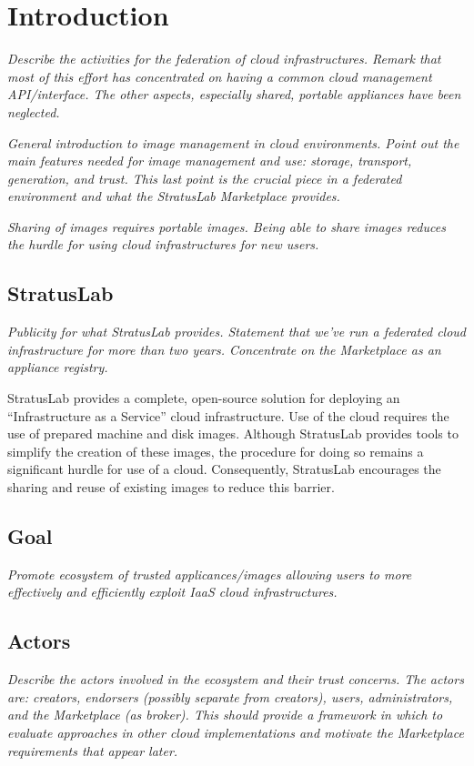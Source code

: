 \section{Introduction}
\label{sec:Introduction}

{\em Describe the activities for the federation of cloud
  infrastructures.  Remark that most of this effort has concentrated
  on having a common cloud management API/interface.  The other
  aspects, especially shared, portable appliances have been
  neglected.}

{\em General introduction to image management in cloud environments.
  Point out the main features needed for image management and use:
  storage, transport, generation, and trust.  This last point is
  the crucial piece in a federated environment and what the StratusLab
  Marketplace provides.}

{\em Sharing of images requires portable images.  Being able to share
  images reduces the hurdle for using cloud infrastructures for new
  users.}

\subsection{StratusLab}

{\em Publicity for what StratusLab provides.  Statement that we've run
  a federated cloud infrastructure for more than two years.
  Concentrate on the Marketplace as an appliance registry.}

StratusLab provides a complete, open-source solution for deploying an
``Infrastructure as a Service'' cloud infrastructure.  Use of the
cloud requires the use of prepared machine and disk images.  Although
StratusLab provides tools to simplify the creation of these images,
the procedure for doing so remains a significant hurdle for use of a
cloud.  Consequently, StratusLab encourages the sharing and reuse of
existing images to reduce this barrier.

\subsection{Goal}

{\em Promote ecosystem of trusted applicances/images allowing users to
  more effectively and efficiently exploit IaaS cloud
  infrastructures.}

\subsection{Actors}

{\em Describe the actors involved in the ecosystem and their trust
  concerns.  The actors are: creators, endorsers (possibly separate
  from creators), users, administrators, and the Marketplace (as
  broker).  This should provide a framework in which to evaluate
  approaches in other cloud implementations and motivate the
  Marketplace requirements that appear later.}
